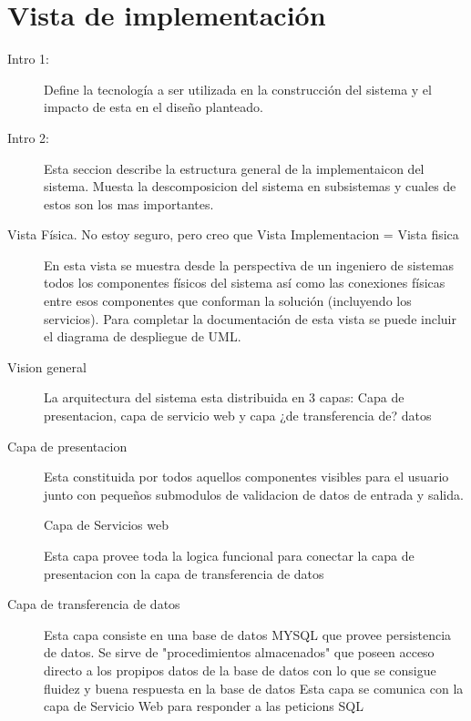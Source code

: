 \chapter{Vista de implementación}

\begin{description}
\item[Intro 1:]Define la tecnología a ser utilizada en la construcción del sistema y el impacto de esta en el diseño planteado.
\item[Intro 2:]Esta seccion describe la estructura general de la implementaicon del sistema. Muesta la descomposicion del sistema en subsistemas y cuales de estos son los mas importantes.
\end{description}



\begin{description}

\item[Vista Física. No estoy seguro, pero creo que Vista Implementacion = Vista fisica]
En esta vista se muestra desde la perspectiva de un ingeniero de sistemas todos los componentes físicos del sistema así como las conexiones físicas entre esos componentes que conforman la solución (incluyendo los servicios). Para completar la documentación de esta vista se puede incluir el diagrama de despliegue de UML.


\item[Vision general]
La arquitectura del sistema esta distribuida en 3 capas: Capa de presentacion, capa de servicio web y capa ¿de transferencia de? datos


\item[Capa de presentacion]
Esta constituida por todos aquellos componentes visibles para el usuario junto con pequeños submodulos de validacion de datos de entrada y salida.

Capa de Servicios web

    Esta capa provee toda la logica funcional para conectar la capa de presentacion con la capa de transferencia de datos


\item[Capa de transferencia de datos]
    Esta capa consiste en una base de datos MYSQL que provee persistencia de datos. Se sirve de "procedimientos almacenados" que poseen acceso directo a los propipos datos de la base de datos con lo que se consigue fluidez y buena respuesta en la base de datos
    Esta capa se comunica con la capa de Servicio Web para responder a las peticions SQL
\end{description}


